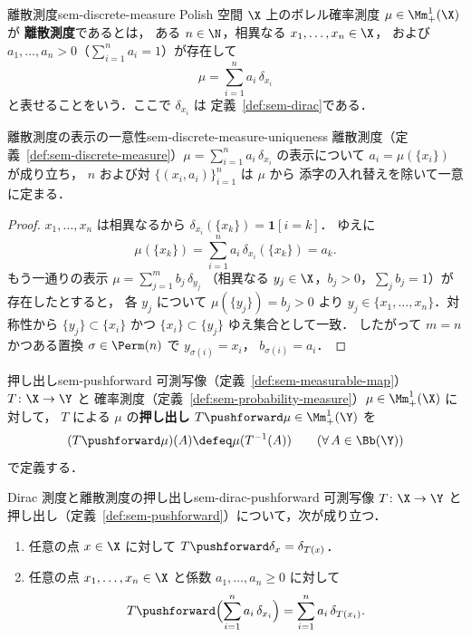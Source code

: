 \begin{definition}{離散測度}{sem-discrete-measure}
  Polish 空間 $\X$ 上のボレル確率測度 $\mu \in \Mm_+^1(\X)$ が
  \textbf{離散測度}であるとは，
  ある $n \in \N$，相異なる $x_1, \ldots, x_n \in \X$，
  および $a_1, \ldots, a_n > 0$（$\sum_{i=1}^n a_i = 1$）が存在して
  \[
    \mu = \sum_{i=1}^{n} a_i\, \delta_{x_i}
  \]
  と表せることをいう．ここで $\delta_{x_i}$ は
  定義~\ref{def:sem-dirac}である．
\end{definition}

\begin{claim}{離散測度の表示の一意性}{sem-discrete-measure-uniqueness}
  離散測度（定義~\ref{def:sem-discrete-measure}）$\mu = \sum_{i=1}^{n} a_i\, \delta_{x_i}$ の表示について
  $a_i = \mu(\{x_i\})$ が成り立ち，
  $n$ および対 $\{(x_i, a_i)\}_{i=1}^{n}$ は $\mu$ から
  添字の入れ替えを除いて一意に定まる．
\end{claim}

\begin{proof}
  $x_1, \ldots, x_n$ は相異なるから
  $\delta_{x_i}(\{x_k\}) = \mathbf{1}[i = k]$．
  ゆえに
  \[
    \mu(\{x_k\}) = \sum_{i=1}^{n} a_i\, \delta_{x_i}(\{x_k\}) = a_k.
  \]
  もう一通りの表示
  $\mu = \sum_{j=1}^{m} b_j\, \delta_{y_j}$
  （相異なる $y_j \in \X$，$b_j > 0$，$\sum_j b_j = 1$）が存在したとすると，
  各 $y_j$ について $\mu(\{y_j\}) = b_j > 0$ より
  $y_j \in \{x_1, \ldots, x_n\}$．対称性から $\{y_j\} \subset \{x_i\}$ かつ
  $\{x_i\} \subset \{y_j\}$ ゆえ集合として一致．
  したがって $m = n$ かつある置換 $\sigma \in \Perm(n)$ で $y_{\sigma(i)} = x_i$，
  $b_{\sigma(i)} = a_i$．
\end{proof}

\begin{definition}{押し出し}{sem-pushforward}
  可測写像（定義~\ref{def:sem-measurable-map}）$T \colon \X \to \Y$ と
  確率測度（定義~\ref{def:sem-probability-measure}）$\mu \in \Mm_+^1(\X)$ に対して，
  $T$ による $\mu$ の\textbf{押し出し} $T\pushforward \mu \in \Mm_+^1(\Y)$ を
  \[
    (T\pushforward \mu)(A) \defeq \mu(T^{-1}(A))
    \qquad (\forall\, A \in \Bb(\Y))
  \]
  で定義する．
\end{definition}

\begin{proposition}{Dirac 測度と離散測度の押し出し}{sem-dirac-pushforward}
  可測写像 $T \colon \X \to \Y$ と
  押し出し（定義~\ref{def:sem-pushforward}）について，次が成り立つ．
  \begin{enumerate}
    \item[(i)] 任意の点 $x \in \X$ に対して
      $T\pushforward \delta_x = \delta_{T(x)}$．
    \item[(ii)] 任意の点 $x_1, \ldots, x_n \in \X$ と係数
      $a_1, \ldots, a_n \geq 0$ に対して
      \[
        T\pushforward \Bigl(\sum_{i=1}^{n} a_i\, \delta_{x_i}\Bigr)
        = \sum_{i=1}^{n} a_i\, \delta_{T(x_i)}.
      \]
  \end{enumerate}
\end{proposition}

